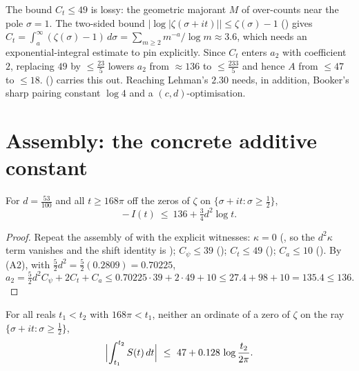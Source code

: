 \begin{remark}
\label{rem:le_tail}
The bound $C_t\le49$ is lossy: the geometric majorant $M$ of 
over-counts near the pole $\sigma=1$. The two-sided bound
$|\log|\zeta(\sigma+it)||\le\zeta(\sigma)-1$ ()
gives $C_t=\int_a^\infty(\zeta(\sigma)-1)\,d\sigma=\sum_{m\ge2}m^{-a}/\log m\approx3.6$,
which needs an exponential-integral estimate to pin explicitly. Since
$C_t$ enters $a_2$ with coefficient $2$, replacing $49$ by $\le\tfrac{23}5$ lowers $a_2$
from $\approx136$ to $\le\tfrac{233}5$ and hence $A$ from $\le47$ to $\le18$.
 () carries this out. Reaching Lehman's $2.30$
needs, in addition, Booker's sharp pairing constant $\log4$ and a $(c,d)$-optimisation.
\end{remark}

\section{Assembly: the concrete additive constant}
\label{sec:le_assembly}

\begin{lemma}
\label{lem:le_I_lower_explicit}
\leanok
{}
For $d=\tfrac{53}{100}$ and all $t\ge168\pi$ off the zeros of $\zeta$ on
$\{\sigma+it:\sigma\ge\tfrac12\}$,
\[
  -\,I(t)\ \le\ 136+\tfrac34 d^2\log t .
\]
\end{lemma}

\begin{proof}
\leanok
Repeat the assembly of  with the explicit
witnesses: $\kappa=0$ (, so the $d^2\kappa$ term vanishes and the
shift identity is ); $C_\psi\le39$
(); $C_t\le49$ (); $C_a\le10$
(). By (A2), with $\tfrac52 d^2=\tfrac52(0.2809)=0.70225$,
\[
  a_2=\tfrac52 d^2 C_\psi+2C_t+C_a
     \le 0.70225\cdot39+2\cdot49+10
     \le 27.4+98+10=135.4\le 136 .
\]
\end{proof}

\begin{theorem}
\label{thm:le_concrete}
\leanok
{}
For all reals $t_1<t_2$ with $168\pi<t_1$, neither an ordinate of a zero of $\zeta$ on
the ray $\{\sigma+it:\sigma\ge\tfrac12\}$,
\[
  \Bigl|\int_{t_1}^{t_2}S(t)\,dt\Bigr|\ \le\ 47+0.128\,\log\frac{t_2}{2\pi} .
\]
\end{theorem}

